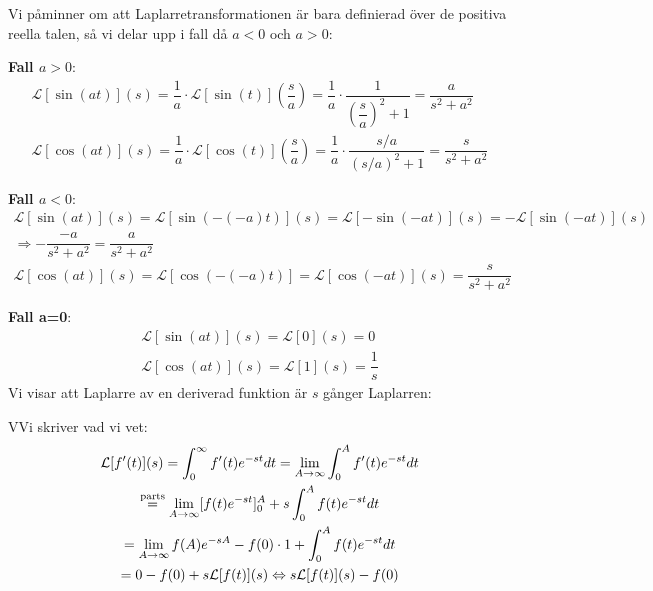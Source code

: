 \par\bigskip
\noindent Vi påminner om att Laplarretransformationen är bara definierad över de positiva reella talen, så vi delar upp i fall då $a<0$ och $a>0$:
\par\bigskip
\textbf{Fall $a>0$}:
\begin{equation*}
  \begin{gathered}
    \mathcal{L}[\sin(at)](s) = \dfrac{1}{a}\cdot\mathcal{L}[\sin(t)]\left(\dfrac{s}{a}\right) = \dfrac{1}{a}\cdot\dfrac{1}{\left(\dfrac{s}{a}\right)^2+1} = \dfrac{a}{s^2+a^2}\\
    \mathcal{L}[\cos(at)](s) = \dfrac{1}{a}\cdot\mathcal{L}[\cos(t)]\left(\dfrac{s}{a}\right) = \dfrac{1}{a}\cdot\dfrac{s/a}{(s/a)^2+1} = \dfrac{s}{s^2+a^2}
  \end{gathered}
\end{equation*}
\par\bigskip
\textbf{Fall $a<0$}:
\begin{equation*}
  \begin{gathered}
    \mathcal{L}[\sin(at)](s) = \mathcal{L}[\sin(-(-a)t)](s) = \mathcal{L}[-\sin(-at)](s) = -\mathcal{L}[\sin(-at)](s)\\
    \Rightarrow -\dfrac{-a}{s^2+a^2} = \dfrac{a}{s^2+a^2}\\
    \mathcal{L}[\cos(at)](s) = \mathcal{L}[\cos(-(-a)t)] = \mathcal{L}[\cos(-at)](s) = \dfrac{s}{s^2+a^2}
  \end{gathered}
\end{equation*}
\par\bigskip
\textbf{Fall a=0}:
\begin{equation*}
  \begin{gathered}
    \mathcal{L}[\sin(at)](s) = \mathcal{L}[0](s) = 0\\
    \mathcal{L}[\cos(at)](s) = \mathcal{L}[1](s) = \dfrac{1}{s}
  \end{gathered}
\end{equation*}
\newpage
\noindent Vi visar att Laplarre av en deriverad funktion är $s$ gånger Laplarren:
\par\bigskip
\begin{prf}
  VVi skriver vad vi vet:
  \begin{equation*}
    \begin{gathered}
      \mathcal{L}[f^{\prime}(t)](s) = \int_{0}^{\infty}f^{\prime}(t)e^{-st}dt = \lim_{A\to\infty}\int_{0}^{A}f^{\prime}(t)e^{-st}dt\\
      \stackrel{\text{parts}}{=} \lim_{A\to\infty}[f(t)e^{-st}]_0^A+s\int_{0}^{A}f(t)e^{-st}dt\\
      =\lim_{A\to\infty} f(A)e^{-sA}-f(0)\cdot1+\int_{0}^{A}f(t)e^{-st}dt\\
      = 0-f(0)+s\mathcal{L}[f(t)](s)\Leftrightarrow s\mathcal{L}[f(t)](s)-f(0)
    \end{gathered}
  \end{equation*}
\end{prf}
